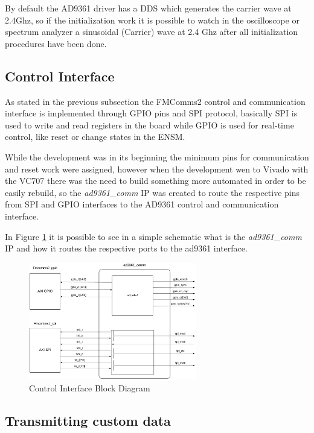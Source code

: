 By default the AD9361 driver has a DDS which generates the carrier wave at 2.4Ghz,
so if the initialization work it is possible to watch in the oscilloscope or
spectrum analyzer a sinusoidal (Carrier) wave at 2.4 Ghz after all initialization
procedures have been done.

\subsection{Control Interface}
\label{subs:controlif}

As stated in the previous subsection the FMComms2 control and communication
interface is implemented through GPIO pins and SPI protocol, basically SPI is
used to write and read registers in the board while GPIO is used for real-time
control, like reset or change states in the ENSM.

While the development was in its beginning the minimum pins for communication
and reset work were assigned, however when the development wen to Vivado with
the VC707 there was the need to build something more automated in order to be
easily rebuild, so the \emph{ad9361\_comm} IP was created to route the respective
pins from SPI and GPIO interfaces to the AD9361 control and communication interface.

In Figure \ref{fig:commif} it is possible to see in a simple schematic what is
the \emph{ad9361\_comm} IP and how it routes the respective ports to the ad9361
interface.

\begin{figure}[htbp]
    \centering
    \includegraphics[width=0.65\textwidth]{./figures/comm_if}
    \caption{ Control Interface Block Diagram
    \label{fig:commif}}
\end{figure}

\subsection{Transmitting custom data}

